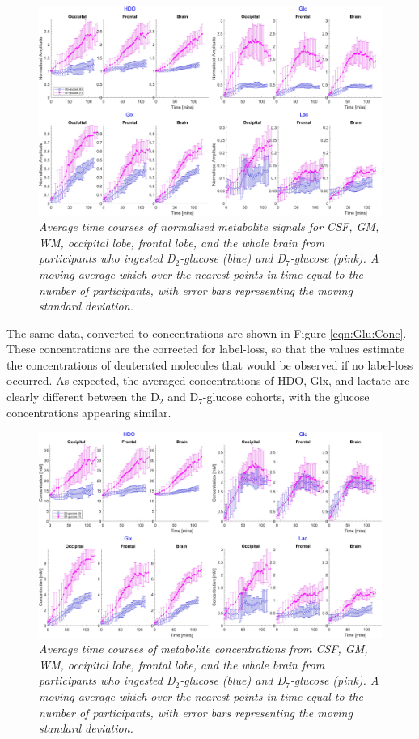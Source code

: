 \begin{figure}
    \centering
    \includegraphics[width = 1\textwidth]{Figures/Glucose/Avg_Amp.png}
    \caption{\textit{Average time courses of normalised metabolite signals for \ac{CSF}, \ac{GM}, \ac{WM}, occipital lobe, frontal lobe, and the whole brain from participants who ingested D$_2$-glucose (blue) and D$_7$-glucose (pink). A moving average which over the nearest points in time equal to the number of participants, with error bars representing the moving standard deviation.}}
    \label{fig:Glu:Avg_Amp}
\end{figure}

The same data, converted to concentrations are shown in Figure \ref{eqn:Glu:Conc}. These concentrations are the corrected for label-loss, so that the values estimate the concentrations of deuterated molecules that would be observed if no label-loss occurred. As expected, the averaged concentrations of \ac{HDO}, Glx, and lactate are clearly different between the D$_2$ and D$_7$-glucose cohorts, with the glucose concentrations appearing similar. 

\begin{figure}
    \centering
    \includegraphics[width = 1\textwidth]{Figures/Glucose/Avg_Conc.png}
    \caption{\textit{Average time courses of metabolite concentrations from \ac{CSF}, \ac{GM}, \ac{WM}, occipital lobe, frontal lobe, and the whole brain from participants who ingested D$_2$-glucose (blue) and D$_7$-glucose (pink). A moving average which over the nearest points in time equal to the number of participants, with error bars representing the moving standard deviation.}}
    \label{fig:Glu:Avg_Conc}
\end{figure}

